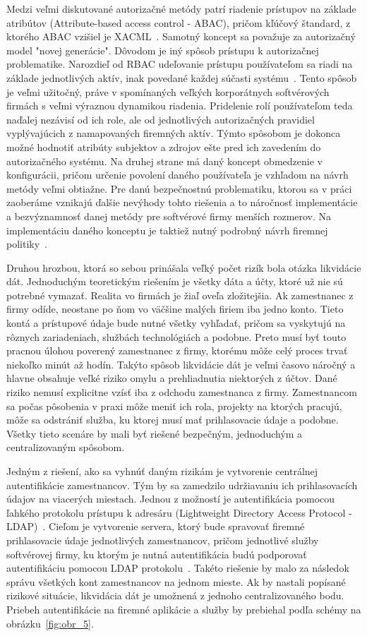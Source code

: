 Medzi veľmi diskutované autorizačné metódy patrí riadenie prístupov na základe atribútov (Attribute-based access
control - ABAC), pričom kľúčový štandard, z ktorého ABAC vzišiel je XACML~\cite{XACML}.
Samotný koncept sa považuje za autorizačný model "novej generácie".
Dôvodom je iný spôsob prístupu k autorizačnej problematike.
Narozdieľ od RBAC udeľovanie prístupu používateľom sa riadi na základe jednotlivých aktív, inak povedané každej súčasti
systému~\cite{ABAC_RBAC_Attributes}.
Tento spôsob je veľmi užitočný, práve v spomínaných veľkých korporátnych softvérových firmách s veľmi výraznou dynamikou riadenia.
Pridelenie rolí používateľom teda naďalej nezávisí od ich role, ale od jednotlivých autorizačných pravidiel vyplývajúcich z namapovaných firemných aktív.
Týmto spôsobom je dokonca možné hodnotiť atribúty subjektov a zdrojov ešte pred ich zavedením do autorizačného systému.
Na druhej strane má daný koncept obmedzenie v konfigurácii, pričom určenie povolení daného používateľa je vzhľadom na návrh metódy veľmi obtiažne.
Pre danú bezpečnostnú problematiku, ktorou sa v práci zaoberáme vznikajú ďalšie nevýhody tohto riešenia a to náročnosť
implementácie a bezvýznamnosť danej metódy pre softvérové firmy menších rozmerov.
Na implementáciu daného konceptu je taktiež nutný podrobný návrh firemnej politiky~\cite{RBAC_ABAC_Encryption}.

Druhou hrozbou, ktorá so sebou prinášala veľký počet rizík bola otázka likvidácie dát.
Jednoduchým teoretickým riešením je všetky dáta a účty, ktoré už nie sú potrebné vymazať.
Realita vo firmách je žiaľ oveľa zložitejšia.
Ak zamestnanec z firmy odíde, neostane po ňom vo väčšine malých firiem iba jedno konto.
Tieto kontá a prístupové údaje bude nutné všetky vyhľadať, pričom sa vyskytujú na rôznych zariadeniach, službách technológiách a podobne.
Preto musí byť touto pracnou úlohou poverený zamestnanec z firmy, ktorému môže celý proces trvať niekoľko minút až hodín.
Takýto spôsob likvidácie dát je veľmi časovo náročný a hlavne obsahuje veľké riziko omylu a prehliadnutia niektorých z účtov.
Dané riziko nemusí explicitne vzísť iba z odchodu zamestnanca z firmy.
Zamestnancom sa počas pôsobenia v praxi môže meniť ich rola, projekty na ktorých pracujú, môže sa odstrániť služba,
ku ktorej musí mať prihlasovacie údaje a podobne.
Všetky tieto scenáre by mali byť riešené bezpečným, jednoduchým a centralizovaným spôsobom.

Jedným z riešení, ako sa vyhnúť daným rizikám je vytvorenie centrálnej autentifikácie zamestnancov.
Tým by sa zamedzilo udržiavaniu ich prihlasovacích údajov na viacerých miestach.
Jednou z možností je autentifikácia pomocou ľahkého protokolu prístupu k adresáru (Lightweight Directory Access Protocol - LDAP)~\cite{LDAP}.
Cieľom je vytvorenie servera, ktorý bude spravovať firemné prihlasovacie údaje jednotlivých zamestnancov, pričom
jednotlivé služby softvérovej firmy, ku ktorým je nutná autentifikácia budú podporovať autentifikáciu pomocou LDAP protokolu~\cite{LDAP_AUTH}.
Takéto riešenie by malo za následok správu všetkých kont zamestnancov na jednom mieste.
Ak by nastali popísané rizikové situácie, likvidácia dát je umožnená z jednoho centralizovaného bodu.
Priebeh autentifikácie na firemné aplikácie a služby by prebiehal podľa schémy na obrázku~\ref{fig:obr_5}.

